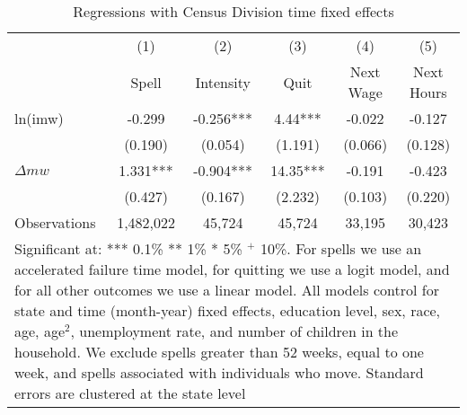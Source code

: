 \documentclass{article}
\begin{document}
\begin{table}
	\centering
	\caption{Regressions with Census Division time fixed effects}
	\begin{tabular}{lccccc}
		
		&  (1) &  (2) &   (3) &      (4)&      (5) \\
		&   Spell &  Intensity &   Quit &       Next Wage &      Next Hours \\
		\hline
		\hline
		ln(imw) &   -0.299 &   -0.256*** &  4.44*** &     -0.022 &    -0.127 \\
		
		&     (0.190) &    (0.054) &    (1.191) &    (0.066) &    (0.128) \\
		
		$\Delta mw$ &   1.331*** & -0.904*** &   14.35*** &  -0.191 &   -0.423 \\
		
		&     (0.427) &    (0.167) &    (2.232) &    (0.103) &    (0.220) \\\hdashline
		
		Observations &  1,482,022 & 45,724 & 45,724 &     33,195 &     30,423 \\
		\hline
		\multicolumn{6}{p{.8\textwidth}}{{\footnotesize Significant at: *** 0.1\% ** 1\% * 5\% $^+$ 10\%. For spells we use an accelerated failure time model, for quitting we use a logit model, and for all other outcomes we use a linear model. All models control for state and time (month-year) fixed effects, education level, sex, race, age, age$^2$, unemployment rate, and number of children in the household. We exclude spells greater than 52 weeks, equal to one week, and spells associated with individuals who move. Standard errors are clustered at the state level }}\\
	\end{tabular}  
	\label{tab:robust_div}
\end{table}
\end{document}
